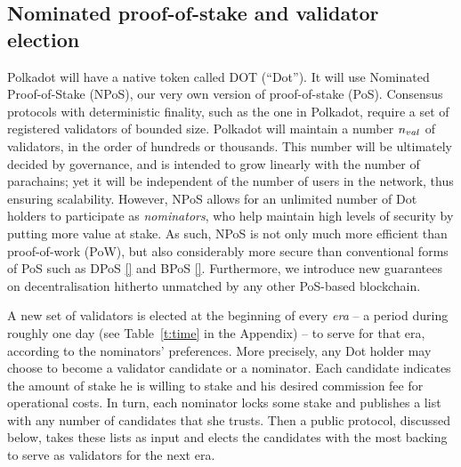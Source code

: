 \subsection{Nominated proof-of-stake and validator election}\label{sec:validators}
Polkadot will have a native token called DOT (``Dot''). It will use Nominated Proof-of-Stake (NPoS), our very own version of proof-of-stake (PoS).
Consensus protocols with deterministic finality, such as the one in Polkadot, 
require a set of registered validators of bounded size.
Polkadot will maintain a number $n_{val}$ of validators, in the order of hundreds or thousands.
This number will be ultimately decided by governance, and is intended to grow linearly with the number of parachains;
yet it will be independent of the number of users in the network, thus ensuring scalability.
However, NPoS allows for an unlimited number of Dot holders to participate as \emph{nominators},
who help maintain high levels of security by putting more value at stake.
As such, NPoS is not only much more efficient than proof-of-work (PoW),
but also considerably more secure than conventional forms of PoS such as DPoS \ref{} and BPoS \ref{}.
Furthermore, we introduce new guarantees on decentralisation hitherto unmatched by any other PoS-based blockchain.

A new set of validators is elected at the beginning of every \emph{era} -- a period during roughly one day (see Table~\ref{t:time} in the Appendix) --
to serve for that era, according to the nominators' preferences.
More precisely, any Dot holder may choose to become a validator candidate or a nominator.
Each candidate indicates the amount of stake he is willing to stake and his desired commission fee for operational costs.
In turn, each nominator locks some stake and publishes a list with any number of candidates that she trusts.
Then a public protocol, discussed below, takes these lists as input and elects the candidates
with the most backing to serve as validators for the next era.

